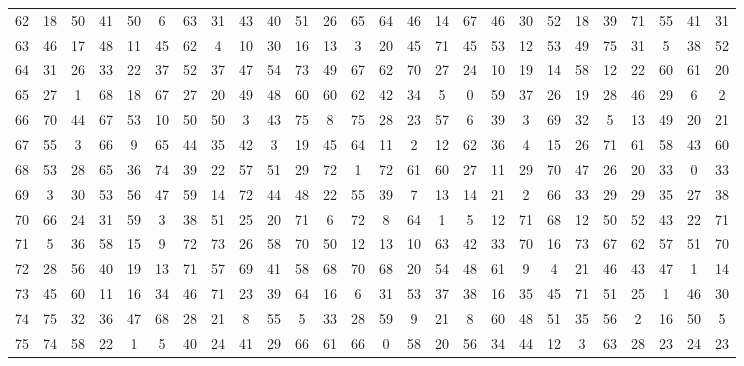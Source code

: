 \begin{table}
\begin{tabular}{c c c c c c c c c c c c c c c c c c c c c c c c c c }
62 & 18 & 50 & 41 & 50 & 6 & 63 & 31 & 43 & 40 & 51 & 26 & 65 & 64 & 46 & 14 & 67 & 46 & 30 & 52 & 18 & 39 & 71 & 55 & 41 & 31 \\
63 & 46 & 17 & 48 & 11 & 45 & 62 & 4 & 10 & 30 & 16 & 13 & 3 & 20 & 45 & 71 & 45 & 53 & 12 & 53 & 49 & 75 & 31 & 5 & 38 & 52 \\
64 & 31 & 26 & 33 & 22 & 37 & 52 & 37 & 47 & 54 & 73 & 49 & 67 & 62 & 70 & 27 & 24 & 10 & 19 & 14 & 58 & 12 & 22 & 60 & 61 & 20 \\
65 & 27 & 1 & 68 & 18 & 67 & 27 & 20 & 49 & 48 & 60 & 60 & 62 & 42 & 34 & 5 & 0 & 59 & 37 & 26 & 19 & 28 & 46 & 29 & 6 & 2 \\
66 & 70 & 44 & 67 & 53 & 10 & 50 & 50 & 3 & 43 & 75 & 8 & 75 & 28 & 23 & 57 & 6 & 39 & 3 & 69 & 32 & 5 & 13 & 49 & 20 & 21 \\
67 & 55 & 3 & 66 & 9 & 65 & 44 & 35 & 42 & 3 & 19 & 45 & 64 & 11 & 2 & 12 & 62 & 36 & 4 & 15 & 26 & 71 & 61 & 58 & 43 & 60 \\
68 & 53 & 28 & 65 & 36 & 74 & 39 & 22 & 57 & 51 & 29 & 72 & 1 & 72 & 61 & 60 & 27 & 11 & 29 & 70 & 47 & 26 & 20 & 33 & 0 & 33 \\
69 & 3 & 30 & 53 & 56 & 47 & 59 & 14 & 72 & 44 & 48 & 22 & 55 & 39 & 7 & 13 & 14 & 21 & 2 & 66 & 33 & 29 & 29 & 35 & 27 & 38 \\
70 & 66 & 24 & 31 & 59 & 3 & 38 & 51 & 25 & 20 & 71 & 6 & 72 & 8 & 64 & 1 & 5 & 12 & 71 & 68 & 12 & 50 & 52 & 43 & 22 & 71 \\
71 & 5 & 36 & 58 & 15 & 9 & 72 & 73 & 26 & 58 & 70 & 50 & 12 & 13 & 10 & 63 & 42 & 33 & 70 & 16 & 73 & 67 & 62 & 57 & 51 & 70 \\
72 & 28 & 56 & 40 & 19 & 13 & 71 & 57 & 69 & 41 & 58 & 68 & 70 & 68 & 20 & 54 & 48 & 61 & 9 & 4 & 21 & 46 & 43 & 47 & 1 & 14 \\
73 & 45 & 60 & 11 & 16 & 34 & 46 & 71 & 23 & 39 & 64 & 16 & 6 & 31 & 53 & 37 & 38 & 16 & 35 & 45 & 71 & 51 & 25 & 1 & 46 & 30 \\
74 & 75 & 32 & 36 & 47 & 68 & 28 & 21 & 8 & 55 & 5 & 33 & 28 & 59 & 9 & 21 & 8 & 60 & 48 & 51 & 35 & 56 & 2 & 16 & 50 & 5 \\
75 & 74 & 58 & 22 & 1 & 5 & 40 & 24 & 41 & 29 & 66 & 61 & 66 & 0 & 58 & 20 & 56 & 34 & 44 & 12 & 3 & 63 & 28 & 23 & 24 & 23 \\
\hline
\end{tabular}
\end{table}